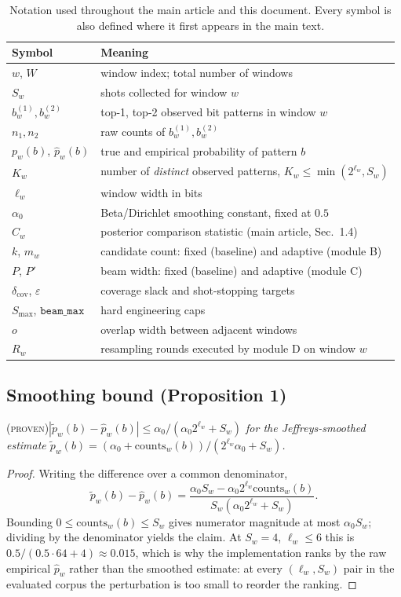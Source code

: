 \documentclass[final,5p,times,longtitle]{elsarticle}
\theoremstyle{plain}
\newcommand{\PROVEN}{\textsc{(proven)}}
\newcommand{\Cw}{C_w}
\newcommand{\dcov}{\delta_{\mathrm{cov}}}
\newcommand{\Smax}{S_{\max}}
\newcommand{\beammax}{\texttt{beam\_max}}
\begin{document}
\begin{table}[h]
\centering\small
\caption{Notation used throughout the main article and this document. Every symbol is also defined where it first appears in the main text.}
\label{tab:notation}
\begin{tabular}{@{}ll@{}}
\toprule
Symbol & Meaning \\
\midrule
$w$, $W$ & window index; total number of windows \\
$S_w$ & shots collected for window $w$ \\
$b^{(1)}_w, b^{(2)}_w$ & top-1, top-2 observed bit patterns in window $w$ \\
$n_1, n_2$ & raw counts of $b^{(1)}_w, b^{(2)}_w$ \\
$p_w(b)$, $\hat p_w(b)$ & true and empirical probability of pattern $b$ \\
$K_w$ & number of \emph{distinct} observed patterns, $K_w\le\min(2^{\ell_w},S_w)$ \\
$\ell_w$ & window width in bits \\
$\alpha_0$ & Beta/Dirichlet smoothing constant, fixed at $0.5$ \\
$\Cw$ & posterior comparison statistic (main article, Sec.~1.4) \\
$k$, $m_w$ & candidate count: fixed (baseline) and adaptive (module B) \\
$P$, $P'$ & beam width: fixed (baseline) and adaptive (module C) \\
$\dcov$, $\varepsilon$ & coverage slack and shot-stopping targets \\
$\Smax$, $\beammax$ & hard engineering caps \\
$o$ & overlap width between adjacent windows \\
$R_w$ & resampling rounds executed by module D on window $w$ \\
\bottomrule
\end{tabular}
\end{table}

\subsection{Smoothing bound (Proposition 1)}
\PROVEN{}\quad\textit{$|\tilde p_w(b)-\hat p_w(b)|\le\alpha_0/(\alpha_0 2^{\ell_w}+S_w)$
for the Jeffreys-smoothed estimate
$\tilde p_w(b)=(\alpha_0+\mathrm{counts}_w(b))/(2^{\ell_w}\alpha_0+S_w)$.}

\begin{proof}
Writing the difference over a common denominator,
\[
\tilde p_w(b)-\hat p_w(b)=\frac{\alpha_0 S_w-\alpha_0 2^{\ell_w}\mathrm{counts}_w(b)}{S_w(\alpha_0 2^{\ell_w}+S_w)} .
\]
Bounding $0\le\mathrm{counts}_w(b)\le S_w$ gives numerator magnitude at
most $\alpha_0 S_w$; dividing by the denominator yields the claim. At
$S_w=4$, $\ell_w\le6$ this is $0.5/(0.5\cdot64+4)\approx0.015$, which is
why the implementation ranks by the raw empirical $\hat p_w$ rather than
the smoothed estimate: at every $(\ell_w,S_w)$ pair in the evaluated
corpus the perturbation is too small to reorder the ranking.
\end{proof}
\end{document}
